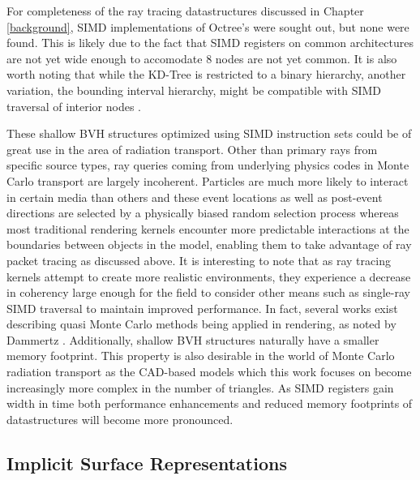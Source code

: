 \documentclass[12pt, a4paper]{article}
\begin{document}
For completeness of the ray tracing datastructures discussed in Chapter \ref{background}, SIMD implementations of Octree's were sought out, but none were found. This is likely due to the fact that SIMD registers on common architectures are not yet wide enough to accomodate 8 nodes are not yet common. It is also worth noting that while the KD-Tree is restricted to a binary hierarchy, another variation, the bounding interval hierarchy, might be compatible with SIMD traversal of interior nodes \cite{Watcher_2006}. 

These shallow BVH structures optimized using SIMD instruction sets could be of great use in the area of radiation transport. Other than primary rays from specific source types, ray queries coming from underlying physics codes in Monte Carlo transport are largely incoherent. Particles are much more likely to interact in certain media than others and these event locations as well as post-event directions are selected by a physically biased random selection process whereas most traditional rendering kernels encounter more predictable interactions at the boundaries between objects in the model, enabling them to take advantage of ray packet tracing as discussed above. It is interesting to note that as ray tracing kernels attempt to create more realistic environments, they experience a decrease in coherency large enough for the field to consider other means such as single-ray SIMD traversal to maintain improved performance. In fact, several works exist describing quasi Monte Carlo methods being applied in rendering, as noted by Dammertz \cite{Dammertz_2008}. Additionally, shallow BVH structures naturally have a smaller memory footprint. This property is also desirable in the world of Monte Carlo radiation transport as the CAD-based models which this work focuses on become increasingly more complex in the number of triangles. As SIMD registers gain width in time both performance enhancements and reduced memory footprints of datastructures will become more pronounced.


\subsection{Implicit Surface Representations}%
\label{implicit_surfaces}
\end{document}
